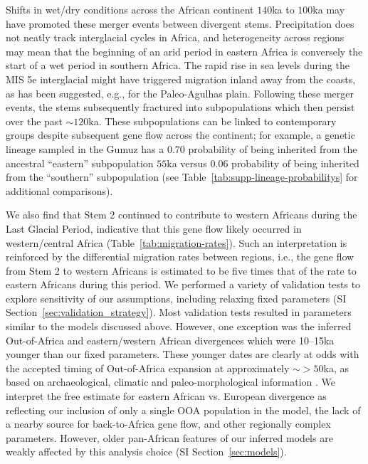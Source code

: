 \documentclass[]{article}
\begin{document}
Shifts in wet/dry conditions across the African continent $140$ka to $100$ka may have
promoted these merger events between divergent stems. 
Precipitation does not neatly track interglacial cycles in Africa,
and heterogeneity across regions may mean that the beginning of an arid period
in eastern Africa is conversely the start of a wet period in
southern Africa\citep{Blome2012-lw}.
The rapid rise in sea levels during the MIS 5e interglacial might have
triggered migration inland away from the
coasts, as has been suggested, e.g., for the Paleo-Agulhas plain\citep{Marean2014-pg}.
Following these merger events, the stems subsequently fractured into
subpopulations which then persist over the past $\sim120$ka. These
subpopulations can be linked to contemporary groups despite subsequent gene
flow across the continent; for example, a genetic lineage sampled in the Gumuz
has a $0.70$ probability of being inherited from the ancestral ``eastern''
subpopulation $55$ka versus $0.06$ probability of being inherited
from the ``southern'' subpopulation (see Table~\ref{tab:supp-lineage-probabilitys} for
additional comparisons). 

We also find that Stem 2 continued to contribute to western Africans during the
Last Glacial Period, indicative that this gene flow likely occurred in
western/central Africa (Table~\ref{tab:migration-rates}). Such an
interpretation is reinforced by the differential migration rates between
regions, i.e., the gene flow from Stem 2 to western Africans is estimated to be
five times that of the rate to eastern Africans during this period. We
performed a variety of validation tests to explore sensitivity of our
assumptions, including relaxing fixed parameters (SI
Section~\ref{sec:validation_strategy}). Most validation tests resulted in
parameters similar to the models discussed above. However, one exception was
the inferred Out-of-Africa and eastern/western African divergences which were
10--15ka younger than our fixed parameters. These younger dates are clearly at 
odds with the accepted timing of Out-of-Africa expansion at approximately $\sim>50$ka, 
as based on archaeological, climatic and paleo-morphological information
\citep{Fu2014-am,Groucutt2015-do,Prufer2021-ao,Beyer2021-ym}. 
We interpret the free estimate for eastern African vs. European divergence as reflecting 
our inclusion of only a single OOA population in the model, the lack of a nearby 
source for back-to-Africa gene flow, and other regionally complex parameters. 
However, older pan-African features of our inferred models are weakly affected by 
this analysis choice (SI Section~\ref{sec:models}).
\end{document}
